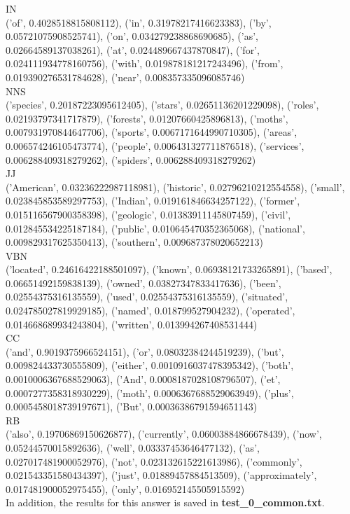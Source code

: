 \documentclass[11pt]{article}
\begin{document}
	IN\\
	('of', 0.4028518815808112), ('in', 0.31978217416623383), ('by', 0.05721075908525741), ('on', 0.034279238868690685), ('as', 0.02664589137038261), ('at', 0.024489667437870847), ('for', 0.024111934778160756), ('with', 0.019878181217243496), ('from', 0.019390276531784628), ('near', 0.008357335096085746)\\
	NNS\\
	('species', 0.20187223095612405), ('stars', 0.02651136201229098), ('roles', 0.02193797341717879), ('forests', 0.01207660425896813), ('moths', 0.007931970844647706), ('sports', 0.0067171644990710305), ('areas', 0.006574246105473774), ('people', 0.006431327711876518), ('services', 0.006288409318279262), ('spiders', 0.006288409318279262)\\
	JJ\\
	('American', 0.03236222987118981), ('historic', 0.02796210212554558), ('small', 0.023845853589297753), ('Indian', 0.019161846634257122), ('former', 0.015116567900358398), ('geologic', 0.01383911145807459), ('civil', 0.012845534225187184), ('public', 0.010645470352365068), ('national', 0.009829317625350413), ('southern', 0.009687378020652213)\\
	VBN\\
	('located', 0.24616422188501097), ('known', 0.06938121733265891), ('based', 0.06651492159838139), ('owned', 0.03827347833417636), ('been', 0.02554375316135559), ('used', 0.02554375316135559), ('situated', 0.024785027819929185), ('named', 0.018799527904232), ('operated', 0.014668689934243804), ('written', 0.013994267408531444)\\
	CC\\
	('and', 0.9019375966524151), ('or', 0.08032384244519239), ('but', 0.009824433730555809), ('either', 0.0010916037478395342), ('both', 0.0010006367688529063), ('And', 0.0008187028108796507), ('et', 0.0007277358318930229), ('moth', 0.0006367688529063949), ('plus', 0.0005458018739197671), ('But', 0.00036386791594651143)\\
	RB\\
	('also', 0.19706869150626877), ('currently', 0.06003884866678439), ('now', 0.05244570015892636), ('well', 0.03337453646477132), ('as', 0.027017481900052976), ('not', 0.023132615221613986), ('commonly', 0.021543351580434397), ('just', 0.01889457884513509), ('approximately', 0.017481900052975455), ('only', 0.016952145505915592)\\
	In addition, the results for this answer is saved in \textbf{test\_0\_common.txt}.\\
	
\end{document}
